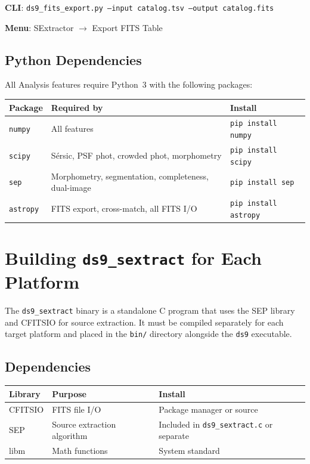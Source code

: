 \documentclass[11pt,fleqn]{book}
\newcommand{\ds}{\texttt{ds9}}
\newcommand{\sextract}{\texttt{ds9\_sextract}}
\begin{document}
\textbf{CLI}: \texttt{ds9\_fits\_export.py --input catalog.tsv --output catalog.fits}

\textbf{Menu}: SExtractor $\to$ Export FITS Table


\section{Python Dependencies}

All Analysis features require Python~3 with the following packages:

\begin{center}
\begin{tabular}{lll}
\toprule
\textbf{Package} & \textbf{Required by} & \textbf{Install} \\
\midrule
\texttt{numpy} & All features & \texttt{pip install numpy} \\
\texttt{scipy} & S\'ersic, PSF phot, crowded phot, morphometry & \texttt{pip install scipy} \\
\texttt{sep} & Morphometry, segmentation, completeness, dual-image & \texttt{pip install sep} \\
\texttt{astropy} & FITS export, cross-match, all FITS I/O & \texttt{pip install astropy} \\
\bottomrule
\end{tabular}
\end{center}


\chapter{Building \sextract{} for Each Platform}
\label{ch:building}

The \sextract{} binary is a standalone C program that uses the SEP library and CFITSIO for source extraction. It must be compiled separately for each target platform and placed in the \texttt{bin/} directory alongside the \ds{} executable.

\section{Dependencies}

\begin{center}
\begin{tabular}{lll}
\toprule
\textbf{Library} & \textbf{Purpose} & \textbf{Install} \\
\midrule
CFITSIO & FITS file I/O & Package manager or source \\
SEP & Source extraction algorithm & Included in \texttt{ds9\_sextract.c} or separate \\
libm & Math functions & System standard \\
\bottomrule
\end{tabular}
\end{center}
\end{document}
